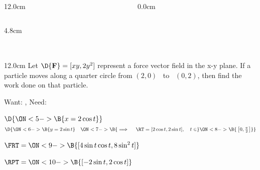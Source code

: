 \begin{frame}
\begin{columns}
\begin{column}{12.0cm}
\begin{columns}
\begin{column}{4.8cm}
	 \ON<12->{\B{$du = -\sin t \, dt$}}
	 
	 \vspace{2.2cm}
	 
\end{column}
\end{columns}

\vspace{2.2cm}

\end{column}\begin{column}{0.0cm}\end{column}\end{columns}
\end{frame}


\begin{frame}
\frametitle{}
\scriptsize
\begin{columns}\begin{column}{12.0cm}
\EX Let $\D{\bf F} = [xy,2y^2]$ represent a force vector field in the x-y plane.  If a particle moves along a quarter circle from $(2,0)$ \, to \, $(0,2)$, then find the work done on that particle.

Want: 
, \quad Need: 

\vspace{0.2cm}


\vspace{0.2cm}

$\D{
\ON<5->{\B{x = 2\cos t}}}$\\
$\D{
\ON<6->{\B{y = 2\sin t}} \quad 
\ON<7->{\B{\implies \quad \RT = [2\cos t, 2\sin t], \quad t \in }}
\ON<8->{\B{\, \left[0, \frac{\pi}{2}\right]}} } $\\

\vspace{0.2cm}

$\FRT = 
\ON<9->{\B{[4\sin t\cos t,8\sin^2 t]}}$
	
\vspace{0.2cm}
	
$\RPT = 
\ON<10->{\B{[-2\sin t, 2\cos t]}}$
	
\vspace{0.2cm}
	

\end{column}
\end{columns}
\end{frame}
